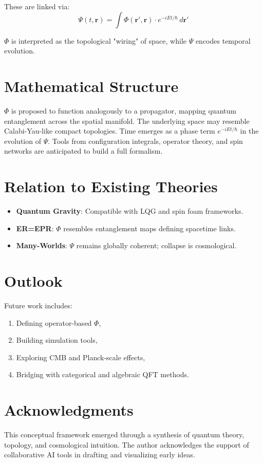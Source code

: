 \documentclass[aps,prd,twocolumn,nofootinbib,superscriptaddress]{revtex4-2}
\begin{document}
These are linked via:
\[
\Psi(t, \mathbf{r}) = \int \Phi(\mathbf{r}', \mathbf{r}) \cdot e^{-iEt/\hbar} \, d\mathbf{r}'
\]

$\Phi$ is interpreted as the topological "wiring" of space, while $\Psi$ encodes temporal evolution.

\section{Mathematical Structure}
$\Phi$ is proposed to function analogously to a propagator, mapping quantum entanglement across the spatial manifold. The underlying space may resemble Calabi-Yau-like compact topologies. Time emerges as a phase term $e^{-iEt/\hbar}$ in the evolution of $\Psi$. Tools from configuration integrals, operator theory, and spin networks are anticipated to build a full formalism.

\section{Relation to Existing Theories}
\begin{itemize}
    \item \textbf{Quantum Gravity}: Compatible with LQG and spin foam frameworks.
    \item \textbf{ER=EPR}: $\Phi$ resembles entanglement maps defining spacetime links.
    \item \textbf{Many-Worlds}: $\Psi$ remains globally coherent; collapse is cosmological.
\end{itemize}

\section{Outlook}
Future work includes:
\begin{enumerate}
    \item Defining operator-based $\Phi$,
    \item Building simulation tools,
    \item Exploring CMB and Planck-scale effects,
    \item Bridging with categorical and algebraic QFT methods.
\end{enumerate}

\section*{Acknowledgments}
This conceptual framework emerged through a synthesis of quantum theory, topology, and cosmological intuition. The author acknowledges the support of collaborative AI tools in drafting and visualizing early ideas.
\end{document}
